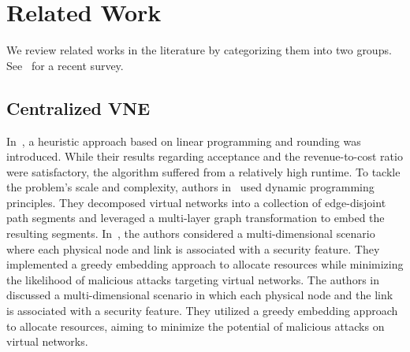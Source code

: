 \section{Related Work}
We review related works in the literature by categorizing them into two groups. See~\cite{survey_1} for a recent survey.

\subsection{Centralized VNE}

In~\cite{chowdhury2011vineyard}, a heuristic approach based on linear programming and rounding was introduced. While their results regarding acceptance and the revenue-to-cost ratio were satisfactory, the algorithm suffered from a relatively high runtime.
%
To tackle the problem's scale and complexity, authors in~\cite{Kibalya_2020_CN} used dynamic programming principles. They decomposed virtual networks into a collection of edge-disjoint path segments and leveraged a multi-layer graph transformation to embed the resulting segments.
%
In~\cite{Cao_2020_WCNCW}, the authors considered a multi-dimensional scenario where each physical node and link is associated with a security feature. They implemented a greedy embedding approach to allocate resources while minimizing the likelihood of malicious attacks targeting virtual networks.
%
The authors in~\cite{Pentelas_2020_NOMS} discussed a multi-dimensional scenario in which each physical node and the link is associated with a security feature. They utilized a greedy embedding approach to allocate resources, aiming to minimize the potential of malicious attacks on virtual networks.
%

